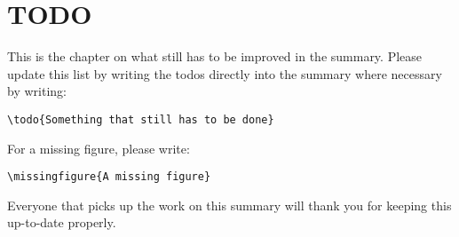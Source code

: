 \documentclass[MachineLearning]{subfiles}
\begin{document}
\section{TODO}
This is the chapter on what still has to be improved in the summary. Please update this list by writing the todos directly into the summary where necessary by writing: \begin{verbatim}
\todo{Something that still has to be done}
\end{verbatim}
For a missing figure, please write: 
\begin{verbatim}
\missingfigure{A missing figure}
\end{verbatim}
Everyone that picks up the work on this summary will thank you for keeping this up-to-date properly.
\listoftodos
\end{document}
